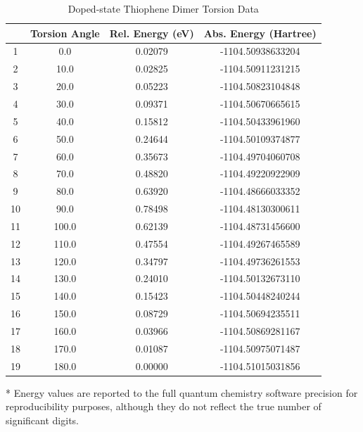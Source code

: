 \begin{table}[hbt!]\centering
\caption{Doped-state Thiophene Dimer Torsion Data}
\renewcommand{\arraystretch}{1.5}
\begin{threeparttable}
\begin{tabular}{cccc}\toprule
  {} & {Torsion Angle} & {Rel. Energy (eV)} & {Abs. Energy (Hartree)} \\ \midrule
    1 & 0.0 & 0.02079 & -1104.50938633204\\
    2 & 10.0 & 0.02825 & -1104.50911231215\\
    3 & 20.0 & 0.05223 & -1104.50823104848\\
    4 & 30.0 & 0.09371 & -1104.50670665615\\
    5 & 40.0 & 0.15812 & -1104.50433961960\\
    6 & 50.0 & 0.24644 & -1104.50109374877\\
    7 & 60.0 & 0.35673 & -1104.49704060708\\
    8 & 70.0 & 0.48820 & -1104.49220922909\\
    9 & 80.0 & 0.63920 & -1104.48666033352\\
    10 & 90.0 & 0.78498 & -1104.48130300611\\
    11 & 100.0 & 0.62139 & -1104.48731456600\\
    12 & 110.0 & 0.47554 & -1104.49267465589\\
    13 & 120.0 & 0.34797 & -1104.49736261553\\
    14 & 130.0 & 0.24010 & -1104.50132673110\\
    15 & 140.0 & 0.15423 & -1104.50448240244\\
    16 & 150.0 & 0.08729 & -1104.50694235511\\
    17 & 160.0 & 0.03966 & -1104.50869281167\\
    18 & 170.0 & 0.01087 & -1104.50975071487\\
    19 & 180.0 & 0.00000 & -1104.51015031856\\ \bottomrule
\end{tabular}
\begin{tablenotes}
\item[*] \footnotesize Energy values are reported to the full quantum chemistry software precision for reproducibility purposes, although they do not reflect the true number of significant digits.
\end{tablenotes}
\end{threeparttable}
\end{table}

